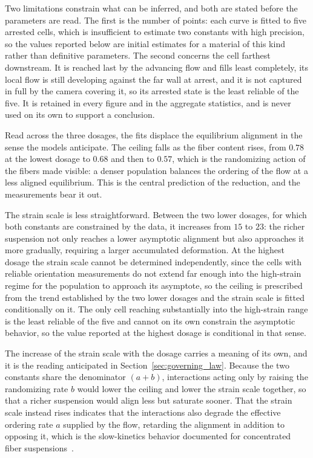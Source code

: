 \documentclass[%
  aip,
  pof,          %
  reprint,      %
  floatfix
]{revtex4-2}
\begin{document}
Two limitations constrain what can be inferred, and both are stated before the parameters are read. The first is the number of points: each curve is fitted to five arrested cells, which is insufficient to estimate two constants with high precision, so the values reported below are initial estimates for a material of this kind rather than definitive parameters. The second concerns the cell farthest downstream. It is reached last by the advancing flow and fills least completely, its local flow is still developing against the far wall at arrest, and it is not captured in full by the camera covering it, so its arrested state is the least reliable of the five. It is retained in every figure and in the aggregate statistics, and is never used on its own to support a conclusion.

Read across the three dosages, the fits displace the equilibrium alignment in the sense the models anticipate. The ceiling falls as the fiber content rises, from $0.78$ at the lowest dosage to $0.68$ and then to $0.57$, which is the randomizing action of the fibers made visible: a denser population balances the ordering of the flow at a less aligned equilibrium. This is the central prediction of the reduction, and the measurements bear it out.

The strain scale is less straightforward. Between the two lower dosages, for which both constants are constrained by the data, it increases from $15$ to $23$: the richer suspension not only reaches a lower asymptotic alignment but also approaches it more gradually, requiring a larger accumulated deformation. At the highest dosage the strain scale cannot be determined independently, since the cells with reliable orientation measurements do not extend far enough into the high-strain regime for the population to approach its asymptote, so the ceiling is prescribed from the trend established by the two lower dosages and the strain scale is fitted conditionally on it. The only cell reaching substantially into the high-strain range is the least reliable of the five and cannot on its own constrain the asymptotic behavior, so the value reported at the highest dosage is conditional in that sense.

The increase of the strain scale with the dosage carries a meaning of its own, and it is the reading anticipated in Section~\ref{sec:governing_law}. Because the two constants share the denominator $(a+b)$, interactions acting only by raising the randomizing rate $b$ would lower the ceiling and lower the strain scale together, so that a richer suspension would align less but saturate sooner. That the strain scale instead rises indicates that the interactions also degrade the effective ordering rate $a$ supplied by the flow, retarding the alignment in addition to opposing it, which is the slow-kinetics behavior documented for concentrated fiber suspensions~\cite{wang2008objective}.
\end{document}
